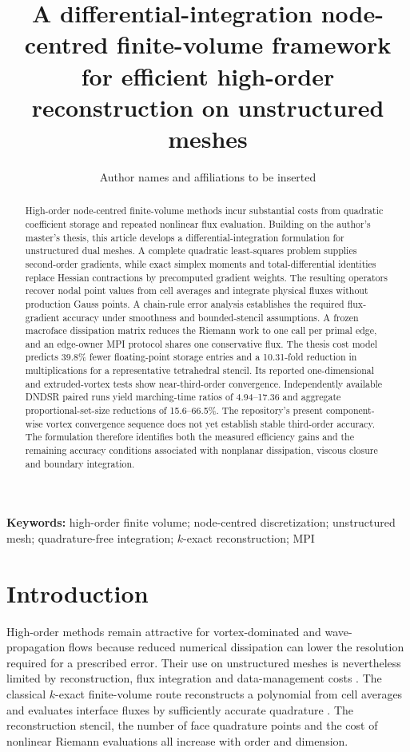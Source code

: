 \documentclass[11pt]{article}
\title{A differential-integration node-centred finite-volume framework for efficient high-order reconstruction on unstructured meshes}
\author{Author names and affiliations to be inserted}
\date{}
\begin{document}
\maketitle

\begin{abstract}
High-order node-centred finite-volume methods incur substantial costs from quadratic coefficient storage and repeated nonlinear flux evaluation.  Building on the author's master's thesis, this article develops a differential-integration formulation for unstructured dual meshes.  A complete quadratic least-squares problem supplies second-order gradients, while exact simplex moments and total-differential identities replace Hessian contractions by precomputed gradient weights.  The resulting operators recover nodal point values from cell averages and integrate physical fluxes without production Gauss points.  A chain-rule error analysis establishes the required flux-gradient accuracy under smoothness and bounded-stencil assumptions.  A frozen macroface dissipation matrix reduces the Riemann work to one call per primal edge, and an edge-owner MPI protocol shares one conservative flux.  The thesis cost model predicts 39.8\% fewer floating-point storage entries and a 10.31-fold reduction in multiplications for a representative tetrahedral stencil.  Its reported one-dimensional and extruded-vortex tests show near-third-order convergence.  Independently available DNDSR paired runs yield marching-time ratios of 4.94--17.36 and aggregate proportional-set-size reductions of 15.6--66.5\%.  The repository's present component-wise vortex convergence sequence does not yet establish stable third-order accuracy.  The formulation therefore identifies both the measured efficiency gains and the remaining accuracy conditions associated with nonplanar dissipation, viscous closure and boundary integration.
\end{abstract}

\noindent\textbf{Keywords:} high-order finite volume; node-centred discretization; unstructured mesh; quadrature-free integration; $k$-exact reconstruction; MPI

\section{Introduction}\label{sec:intro}

High-order methods remain attractive for vortex-dominated and wave-propagation flows because reduced numerical dissipation can lower the resolution required for a prescribed error.  Their use on unstructured meshes is nevertheless limited by reconstruction, flux integration and data-management costs \cite{wang2007review}.  The classical $k$-exact finite-volume route reconstructs a polynomial from cell averages and evaluates interface fluxes by sufficiently accurate quadrature \cite{barth1990,ollivier2002}.  The reconstruction stencil, the number of face quadrature points and the cost of nonlinear Riemann evaluations all increase with order and dimension.
\end{document}
